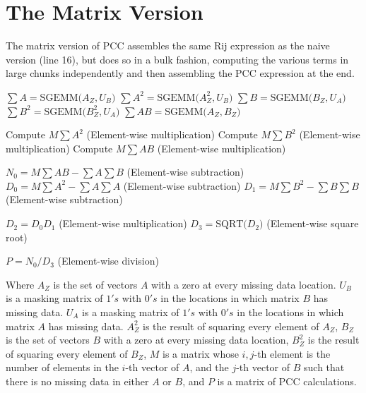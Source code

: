 \documentclass{bioinfo}
\begin{document}
\section{The Matrix Version}
The matrix version of PCC assembles the same Rij expression as the naive version (line 16), 
but does so in a bulk fashion, computing the various terms in large chunks independently
and then assembling the PCC expression at the end.
\begin{algorithmic}[1]

  \STATE $\sum A=\text{SGEMM(}A_Z,U_B\text{)}$
  \STATE $\sum A^2=\text{SGEMM(}A_Z^2,U_B\text{)}$
  \STATE $\sum B=\text{SGEMM(}B_Z,U_A\text{)}$
  \STATE $\sum B^2=\text{SGEMM(}B_Z^2,U_A\text{)}$
  \STATE $\sum AB=\text{SGEMM(}A_Z,B_Z\text{)}$
  
  \vspace{2mm}

  \STATE Compute $M\sum A^2$   (Element-wise multiplication)
  \STATE Compute $M\sum B^2$   (Element-wise multiplication)
  \STATE Compute $M\sum AB$   (Element-wise multiplication)
  
  \vspace{2mm}

  \STATE $N_0=M\sum AB - \sum A\sum B$   (Element-wise subtraction)
  \STATE $D_0=M\sum A^2 - \sum A\sum A$   (Element-wise subtraction)
  \STATE $D_1=M\sum B^2 - \sum B\sum B$   (Element-wise subtraction)

  \vspace{2mm}

  \STATE $D_2=D_0 D_1 $   (Element-wise multiplication)
  \STATE $D_3=\text{SQRT(}D_2\text{)}$   (Element-wise square root)

  \vspace{2mm}

  \STATE $P=N_0 / D_3$   (Element-wise division)
  
\end{algorithmic}

\noindent Where $A_Z$ is the set of vectors $A$ with a zero at every missing data location.
$U_B$ is a masking matrix of $1's$ with $0's$ in the locations in which matrix $B$ has missing data. 
$U_A$ is a masking matrix of $1's$ with $0's$ in the locations in which matrix $A$ has missing data.
$A_Z^2$ is the result of squaring every element of $A_Z$, 
$B_Z$ is the set of vectors $B$ with a zero at every missing data location, 
$B_Z^2$ is the result of squaring every element of $B_Z$, 
$M$ is a matrix whose $i, j$-th element is the number of 
elements in the $i$-th vector of $A$, and the $j$-th vector of $B$ 
such that there is no missing data in either $A$ or $B$, and $P$ is 
a matrix of PCC calculations. 
\end{document}
